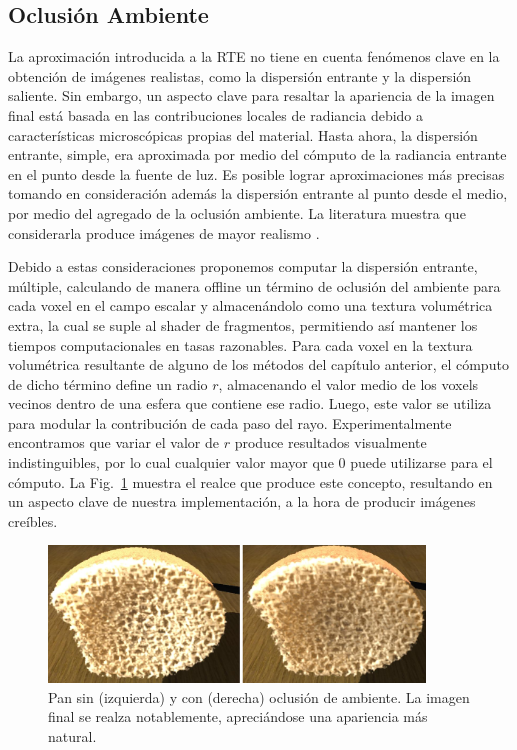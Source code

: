 \subsection{Oclusión Ambiente}

La aproximación introducida a la RTE no tiene en cuenta fenómenos clave en la obtención de imágenes realistas, como la dispersión entrante y la dispersión saliente.
Sin embargo, un aspecto clave para resaltar la apariencia de la imagen final está basada en las contribuciones locales de radiancia debido a características microscópicas propias del material.
Hasta ahora, la dispersión entrante, simple, era aproximada por medio del cómputo de la radiancia entrante en el punto desde la fuente de luz.
Es posible lograr aproximaciones más precisas tomando en consideración además la dispersión entrante al punto desde el medio, por medio del agregado de la oclusión ambiente.
La literatura muestra que considerarla produce imágenes de mayor realismo \cite{Hernell2010}.

Debido a estas consideraciones proponemos computar la dispersión entrante, múltiple, calculando de manera offline un término de oclusión del ambiente para cada voxel en el campo escalar y almacenándolo como una textura volumétrica extra, la cual se suple al shader de fragmentos, permitiendo así mantener los tiempos computacionales en tasas razonables.
Para cada voxel en la textura volumétrica resultante de alguno de los métodos del capítulo anterior, el cómputo de dicho término define un radio $r$, almacenando el valor medio de los voxels vecinos dentro de una esfera que contiene ese radio.
Luego, este valor se utiliza para modular la contribución de cada paso del rayo.
Experimentalmente encontramos que variar el valor de $r$ produce resultados visualmente indistinguibles, por lo cual cualquier valor mayor que $0$ puede utilizarse para el cómputo.
La Fig.~\ref{fg:occlusion} muestra el realce que produce este concepto, resultando en un aspecto clave de nuestra implementación, a la hora de producir imágenes creíbles. 



\begin{figure}
\centerline{\includegraphics[width=10cm]{figures/occlusion}}
  \caption[Pan renderizado sin y con oclusión de ambiente]{Pan sin (izquierda) y con (derecha) oclusión de ambiente. La imagen final se realza notablemente, apreciándose una apariencia más natural.}
  \label{fg:occlusion}
\end{figure}
 
